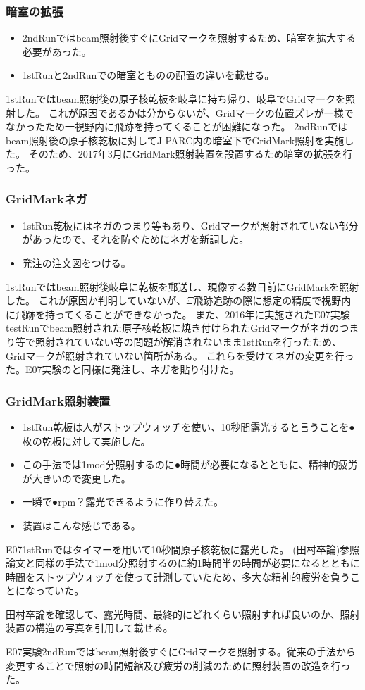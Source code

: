 \documentclass[12pt,a4paper]{jarticle}
\begin{document}
\subsubsection{暗室の拡張}
\begin{itemize}
 \item 2ndRunではbeam照射後すぐにGridマークを照射するため、暗室を拡大する必要があった。
 \item 1stRunと2ndRunでの暗室とものの配置の違いを載せる。
\end{itemize}
1stRunではbeam照射後の原子核乾板を岐阜に持ち帰り、岐阜でGridマークを照射した。
これが原因であるかは分からないが、Gridマークの位置ズレが一様でなかったため一視野内に飛跡を持ってくることが困難になった。
2ndRunではbeam照射後の原子核乾板に対してJ-PARC内の暗室下でGridMark照射を実施した。
そのため、2017年3月にGridMark照射装置を設置するため暗室の拡張を行った。
\par
\subsubsection{GridMarkネガ}
\begin{itemize}
 \item 1stRun乾板にはネガのつまり等もあり、Gridマークが照射されていない部分があったので、それを防ぐためにネガを新調した。
 \item 発注の注文図をつける。
\end{itemize}
1stRunではbeam照射後岐阜に乾板を郵送し、現像する数日前にGridMarkを照射した。
これが原因か判明していないが、$\Xi$飛跡追跡の際に想定の精度で視野内に飛跡を持ってくることができなかった。
また、2016年に実施されたE07実験testRunでbeam照射された原子核乾板に焼き付けられたGridマークがネガのつまり等で照射されていない等の問題が解消されないまま1stRunを行ったため、Gridマークが照射されていない箇所がある。
これらを受けてネガの変更を行った。E07実験のと同様に発注し、ネガを貼り付けた。
\subsubsection{GridMark照射装置}
\begin{itemize}
 \item 1stRun乾板は人がストップウォッチを使い、10秒間露光すると言うことを●枚の乾板に対して実施した。
 \item この手法では1mod分照射するのに●時間が必要になるとともに、精神的疲労が大きいので変更した。
 \item 一瞬で●rpm？露光できるように作り替えた。
 \item 装置はこんな感じである。
\end{itemize}
E071stRunではタイマーを用いて10秒間原子核乾板に露光した。
(田村卒論)参照論文と同様の手法で1mod分照射するのに約1時間半の時間が必要になるとともに時間をストップウォッチを使って計測していたため、多大な精神的疲労を負うことになっていた。
\par
田村卒論を確認して、露光時間、最終的にどれくらい照射すれば良いのか、照射装置の構造の写真を引用して載せる。
\par
E07実験2ndRunではbeam照射後すぐにGridマークを照射する。従来の手法から変更することで照射の時間短縮及び疲労の削減のために照射装置の改造を行った。
\end{document}
